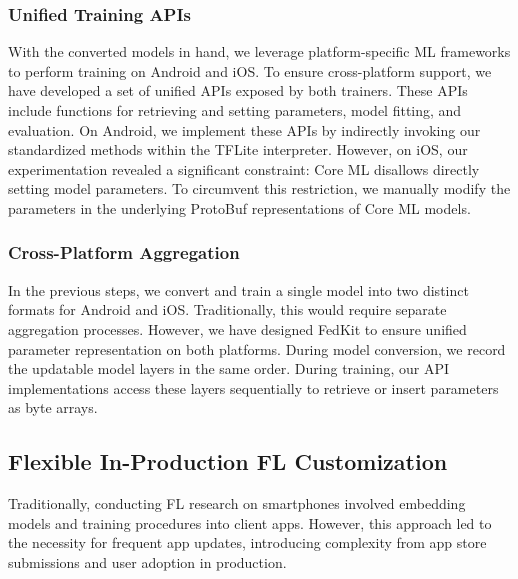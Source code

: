 \documentclass[letterpaper]{article} %
\begin{document}
\subsubsection{Unified Training APIs}
With the converted models in hand,
we leverage platform-specific ML frameworks to
perform training on Android and iOS.
To ensure cross-platform support,
we have developed a set of unified APIs exposed by both trainers.
These APIs include functions for retrieving and setting parameters,
model fitting, and evaluation.
On Android, we implement these APIs by indirectly invoking
our standardized methods within the TFLite interpreter.
However, on iOS, our experimentation revealed a significant constraint:
Core ML disallows directly setting model parameters.
To circumvent this restriction,
we manually modify the parameters in the underlying ProtoBuf representations of
Core ML models.

\subsubsection{Cross-Platform Aggregation}
In the previous steps,
we convert and train a single model into two distinct formats for
Android and iOS.
Traditionally, this would require separate aggregation processes.
However, we have designed FedKit to ensure unified parameter representation
on both platforms.
During model conversion,
we record the updatable model layers in the same order.
During training,
our API implementations access these layers sequentially to
retrieve or insert parameters as byte arrays.

\subsection{Flexible In-Production FL Customization}
\newcommand{\model}{$M$}
\newcommand{\fs}{$S_\mathrm F$}
Traditionally, conducting FL research on smartphones involved
embedding models and training procedures into client apps.
However, this approach led to the necessity for frequent app updates,
introducing complexity from app store submissions and user adoption
in production.
\end{document}
